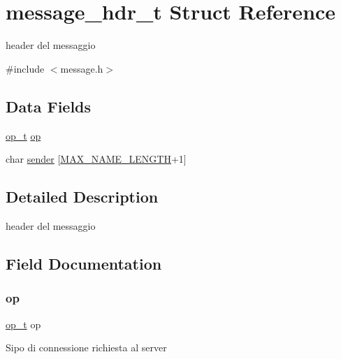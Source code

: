 \hypertarget{structmessage__hdr__t}{}\section{message\+\_\+hdr\+\_\+t Struct Reference}
\label{structmessage__hdr__t}


header del messaggio  




{\ttfamily \#include $<$message.\+h$>$}

\subsection*{Data Fields}
\begin{DoxyCompactItemize}
\item 
\hyperlink{ops_8h_ac6fa1b34da8872e34c2936391332f44c}{op\+\_\+t} \hyperlink{structmessage__hdr__t_a26b2efa792334cce1cd82d1c63754539}{op}
\item 
char \hyperlink{structmessage__hdr__t_a6aa18d82629c912fe68c229936b87c77}{sender} \mbox{[}\hyperlink{config_8h_a0c397a708cec89c74029582574516b30}{M\+A\+X\+\_\+\+N\+A\+M\+E\+\_\+\+L\+E\+N\+G\+TH}+1\mbox{]}
\end{DoxyCompactItemize}


\subsection{Detailed Description}
header del messaggio 

\subsection{Field Documentation}
\mbox{\label{structmessage__hdr__t_a26b2efa792334cce1cd82d1c63754539}} 
\subsubsection{\texorpdfstring{op}{op}}
{\footnotesize\ttfamily \hyperlink{ops_8h_ac6fa1b34da8872e34c2936391332f44c}{op\+\_\+t} op}

Sipo di connessione richiesta al server \mbox{\label{structmessage__hdr__t_a6aa18d82629c912fe68c229936b87c77}} 
